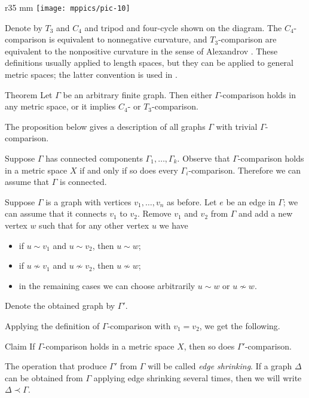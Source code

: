 \documentclass{article}
\begin{document}
\begin{wrapfigure}{r}{35 mm}
\vskip-6mm
\centering
\texttt{[image: mppics/pic-10]}
\end{wrapfigure}

Denote by $T_3$ and $C_4$ and tripod and four-cycle shown on the diagram.
The $C_4$-comparison is equivalent to nonnegative curvature,
and $T_3$-comparison are equivalent to the nonpositive curvature in the sense of Alexandrov \cite{lebedeva-petrunin-zolotov}.
These definitions usually applied to length spaces, but they can be applied to general metric spaces;
the latter convention is used in \cite{alexander2019alexandrov}.

\begin{thm}{Theorem}
Let $\Gamma$ be an arbitrary finite graph.
Then either $\Gamma$-comparison holds in any metric space,
or it implies $C_4$- or $T_3$-comparison.
\end{thm}

The proposition below gives a description of all graphs $\Gamma$ with trivial $\Gamma$-comparison.

Suppose $\Gamma$ has connected components $\Gamma_1,\dots,\Gamma_k$.
Observe that $\Gamma$-comparison holds in a metric space $X$ if and only if so does every $\Gamma_i$-comparison.
Therefore we can assume that $\Gamma$ is connected.

Suppose $\Gamma$ is a graph with vertices $v_1,\dots,v_n$ as before.
Let $e$ be an edge in $\Gamma$; we can assume that it connects $v_1$ to $v_2$.
Remove $v_1$ and $v_2$ from $\Gamma$ and add a new vertex $w$ such that for any other vertex $u$ we have
\begin{itemize}
 \item if $u\sim v_1$ and $u\sim v_2$, then $u\sim w$;
 \item if $u\nsim v_1$ and $u\nsim v_2$, then $u\nsim w$;
 \item in the remaining cases we can choose arbitrarily $u\sim w$ or $u\nsim w$.
\end{itemize}
Denote the obtained graph by $\Gamma'$.

Applying the definition of $\Gamma$-comparison with $v_1=v_2$, we get the following.

\begin{thm}{Claim}
If $\Gamma$-comparison holds in a metric space $X$, then so does $\Gamma'$-comparison.

\end{thm}

The operation that produce $\Gamma'$ from $\Gamma$ will be called \emph{edge shrinking}.
If a graph $\Delta$ can be obtained from $\Gamma$ applying edge shrinking several times, then we will write $\Delta\prec \Gamma$.
\end{document}
